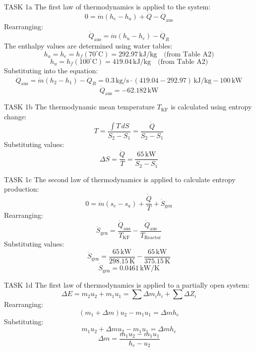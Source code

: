 TASK 1a  
The first law of thermodynamics is applied to the system:  
\[
0 = \dot{m}(h_e - h_a) + \dot{Q} - \dot{Q}_{\text{aus}}
\]  
Rearranging:  
\[
\dot{Q}_{\text{aus}} = \dot{m}(h_u - h_e) - \dot{Q}_R
\]  
The enthalpy values are determined using water tables:  
\[
h_a = h_e = h_f(70^\circ\text{C}) = 292.97 \, \text{kJ/kg} \quad \text{(from Table A2)}
\]  
\[
h_u = h_f(100^\circ\text{C}) = 419.04 \, \text{kJ/kg} \quad \text{(from Table A2)}
\]  
Substituting into the equation:  
\[
\dot{Q}_{\text{aus}} = \dot{m}(h_2 - h_1) - \dot{Q}_R = 0.3 \, \text{kg/s} \cdot (419.04 - 292.97) \, \text{kJ/kg} - 100 \, \text{kW}
\]  
\[
\dot{Q}_{\text{aus}} = -62.182 \, \text{kW}
\]  

TASK 1b  
The thermodynamic mean temperature \( T_{\text{KF}} \) is calculated using entropy change:  
\[
T = \frac{\int T \, dS}{S_2 - S_1} = \frac{\dot{Q}}{S_2 - S_1}
\]  
Substituting values:  
\[
\Delta S = \frac{\dot{Q}}{T} = \frac{65 \, \text{kW}}{S_2 - S_1}
\]  

TASK 1c  
The second law of thermodynamics is applied to calculate entropy production:  
\[
0 = \dot{m}(s_e - s_a) + \frac{\dot{Q}}{T} + \dot{S}_{\text{gen}}
\]  
Rearranging:  
\[
\dot{S}_{\text{gen}} = \frac{\dot{Q}_{\text{aus}}}{T_{\text{KF}}} - \frac{\dot{Q}_{\text{aus}}}{T_{\text{Reactor}}}
\]  
Substituting values:  
\[
\dot{S}_{\text{gen}} = \frac{65 \, \text{kW}}{298.15 \, \text{K}} - \frac{65 \, \text{kW}}{375.15 \, \text{K}}
\]  
\[
\dot{S}_{\text{gen}} = 0.0461 \, \text{kW/K}
\]  

TASK 1d  
The first law of thermodynamics is applied to a partially open system:  
\[
\Delta E = m_2 u_2 + m_1 u_1 = \sum \Delta m_i h_i + \sum \Delta Z_i
\]  
Rearranging:  
\[
(m_1 + \Delta m) u_2 - m_1 u_1 = \Delta m h_e
\]  
Substituting:  
\[
m_1 u_2 + \Delta m u_2 - m_1 u_1 = \Delta m h_e
\]  
\[
\Delta m = \frac{m_1 u_2 - m_1 u_1}{h_e - u_2}
\]